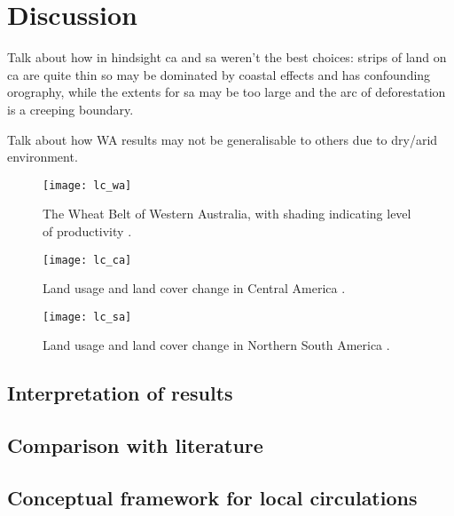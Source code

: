 \chapter{Discussion}
\label{ch:discussion}

Talk about how in hindsight ca and sa weren't the best choices: strips of land on ca are quite thin so may be dominated by coastal effects and has confounding orography, while the extents for sa may be too large and the arc of deforestation is a creeping boundary.

Talk about how WA results may not be generalisable to others due to dry/arid environment.

\begin{figure}[!ht]
	\centering
	\texttt{[image: lc\_wa]}
	\caption[Western Australia Land Usage]{The Wheat Belt of Western Australia, with shading indicating level of productivity \citep{dpird_2021}.}
	\label{fig:lc_wa}
\end{figure}

\begin{figure}[!ht]
	\centering
	\texttt{[image: lc\_ca]}
	\caption[Central America Land Usage]{Land usage and land cover change in Central America \citep{ipcc_2007}.}
	\label{fig:lc_ca}
\end{figure}

\begin{figure}[!ht]
	\centering
	\texttt{[image: lc\_sa]}
	\caption[Northern Brazil Land Usage]{Land usage and land cover change in Northern South America \citep{ipcc_2007}.}
	\label{fig:lc_sa}
\end{figure}

\section{Interpretation of results}

\section{Comparison with literature}

\section{Conceptual framework for local circulations}

